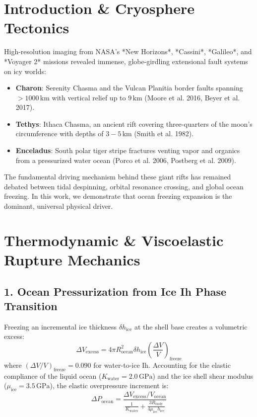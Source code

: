 \documentclass[11pt,a4paper]{article}
\begin{document}
\section{Introduction \& Cryosphere Tectonics}
High-resolution imaging from NASA's *New Horizons*, *Cassini*, *Galileo*, and *Voyager 2* missions revealed immense, globe-girdling extensional fault systems on icy worlds:
\begin{itemize}
    \item \textbf{Charon}: Serenity Chasma and the Vulcan Planitia border faults spanning $> 1000\,\mathrm{km}$ with vertical relief up to $9\,\mathrm{km}$ (Moore et al. 2016, Beyer et al. 2017).
    \item \textbf{Tethys}: Ithaca Chasma, an ancient rift covering three-quarters of the moon's circumference with depths of $3-5\,\mathrm{km}$ (Smith et al. 1982).
    \item \textbf{Enceladus}: South polar tiger stripe fractures venting vapor and organics from a pressurized water ocean (Porco et al. 2006, Postberg et al. 2009).
\end{itemize}
The fundamental driving mechanism behind these giant rifts has remained debated between tidal despinning, orbital resonance crossing, and global ocean freezing. In this work, we demonstrate that ocean freezing expansion is the dominant, universal physical driver.

\section{Thermodynamic \& Viscoelastic Rupture Mechanics}

\subsection{1. Ocean Pressurization from Ice Ih Phase Transition}
Freezing an incremental ice thickness $\delta h_{\text{ice}}$ at the shell base creates a volumetric excess:
\begin{equation}
\Delta V_{\text{excess}} = 4\pi R_{\text{ocean}}^2 \delta h_{\text{ice}} \left( \frac{\Delta V}{V} \right)_{\text{freeze}}
\end{equation}
where $(\Delta V / V)_{\text{freeze}} = 0.090$ for water-to-ice Ih. Accounting for the elastic compliance of the liquid ocean ($K_{\text{water}} = 2.0\,\mathrm{GPa}$) and the ice shell shear modulus ($\mu_{\text{ice}} = 3.5\,\mathrm{GPa}$), the elastic overpressure increment is:
\begin{equation}
\Delta P_{\text{ocean}} = \frac{\Delta V_{\text{excess}} / V_{\text{ocean}}}{ \frac{1}{K_{\text{water}}} + \frac{3 R_{\text{body}}}{4 \mu_{\text{ice}} h_{\text{ice}}} }
\end{equation}
\end{document}
